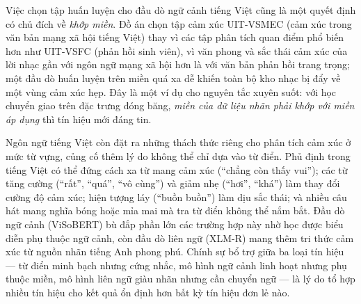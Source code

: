 \documentclass[../DoAn.tex]{subfiles}
\begin{document}
Việc chọn tập huấn luyện cho đầu dò ngữ cảnh tiếng Việt cũng là một quyết định có chủ đích về \textit{khớp miền}. Đồ án chọn tập cảm xúc UIT-VSMEC \cite{ho2020vsmec} (cảm xúc trong văn bản mạng xã hội tiếng Việt) thay vì các tập phân tích quan điểm phổ biến hơn như UIT-VSFC \cite{nguyen2018vsfc} (phản hồi sinh viên), vì văn phong và sắc thái cảm xúc của lời nhạc gần với ngôn ngữ mạng xã hội hơn là với văn bản phản hồi trang trọng; một đầu dò huấn luyện trên miền quá xa dễ khiến toàn bộ kho nhạc bị đẩy về một vùng cảm xúc hẹp. Đây là một ví dụ cho nguyên tắc xuyên suốt: với học chuyển giao trên đặc trưng đóng băng, \textit{miền của dữ liệu nhãn phải khớp với miền áp dụng} thì tín hiệu mới đáng tin.

Ngôn ngữ tiếng Việt còn đặt ra những thách thức riêng cho phân tích cảm xúc ở mức từ vựng, củng cố thêm lý do không thể chỉ dựa vào từ điển. Phủ định trong tiếng Việt có thể đứng cách xa từ mang cảm xúc (``chẳng còn thấy vui''); các từ tăng cường (``rất'', ``quá'', ``vô cùng'') và giảm nhẹ (``hơi'', ``khá'') làm thay đổi cường độ cảm xúc; hiện tượng láy (``buồn buồn'') làm dịu sắc thái; và nhiều câu hát mang nghĩa bóng hoặc mỉa mai mà tra từ điển không thể nắm bắt. Đầu dò ngữ cảnh (ViSoBERT) bù đắp phần lớn các trường hợp này nhờ học được biểu diễn phụ thuộc ngữ cảnh, còn đầu dò liên ngữ (XLM-R) mang thêm tri thức cảm xúc từ nguồn nhãn tiếng Anh phong phú. Chính sự bổ trợ giữa ba loại tín hiệu --- từ điển minh bạch nhưng cứng nhắc, mô hình ngữ cảnh linh hoạt nhưng phụ thuộc miền, mô hình liên ngữ giàu nhãn nhưng cần chuyển ngữ --- là lý do tổ hợp nhiều tín hiệu cho kết quả ổn định hơn bất kỳ tín hiệu đơn lẻ nào.
\end{document}
